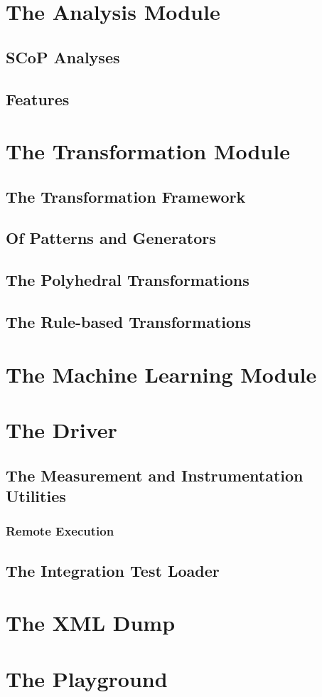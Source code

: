 \section{The Analysis Module}
\subsection{SCoP Analyses}
\subsection{Features}

\section{The Transformation Module}
\subsection{The Transformation Framework}
\subsection{Of Patterns and Generators}
\subsection{The Polyhedral Transformations}
\subsection{The Rule-based Transformations}

\section{The Machine Learning Module}

\section{The Driver}
\subsection{The Measurement and Instrumentation Utilities}
\subsubsection{Remote Execution}
\subsection{The Integration Test Loader}

\section{The XML Dump}
\section{The Playground}
